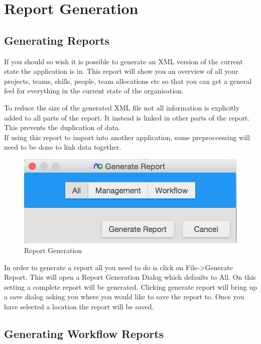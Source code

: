 \section{Report Generation}

\subsection{Generating Reports}

If you should so wish it is possible to generate an XML version of the current state the application is in. This report will show you an overview of all your projects, teams, skills, people, team allocations etc so that you can get a general feel for everything in the current state of the organisation.

To reduce the size of the generated XML file not all information is explicitly added to all parts of the report. It instead is linked in other parts of the report. This prevents the duplication of data.\\
If using this report to import into another application, some preproccessing will need to be done to link data together.

\begin{figure}[H]
	\centering
	\includegraphics[width=\textwidth]{images/screenshots/report1.PNG}
	\caption{Report Generation}
	\label{fig:generate_report_all}
\end{figure}

In order to generate a report all you need to do is click on File-\textgreater Generate Report. This will open a  Report Generation Dialog which defaults to All. On this setting a complete report will be generated. Clicking generate report will bring up a save dialog asking you where you would like to save the report to. Once you have selected a location the report will be saved.

\subsection{Generating Workflow Reports}

